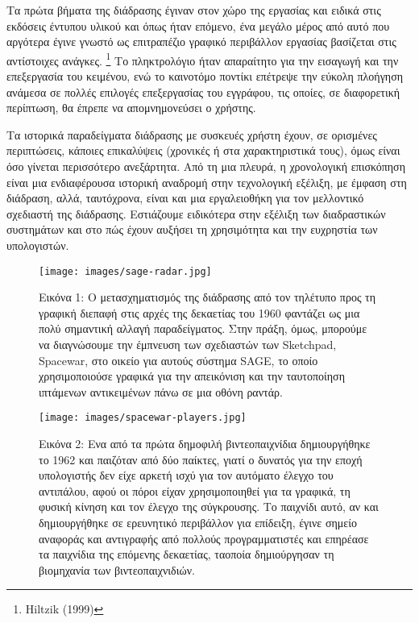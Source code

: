 \documentclass[
]{article}
\begin{document}
Τα πρώτα βήματα της διάδρασης έγιναν στον χώρο της εργασίας και ειδικά
στις εκδόσεις έντυπου υλικού και όπως ήταν επόμενο, ένα μεγάλο μέρος από
αυτό που αργότερα έγινε γνωστό ως επιτραπέζιο γραφικό περιβάλλον
εργασίας βασίζεται στις αντίστοιχες ανάγκες. \footnote{Hiltzik (1999)}
Το πληκτρολόγιο ήταν απαραίτητο για την εισαγωγή και την επεξεργασία του
κειμένου, ενώ το καινοτόμο ποντίκι επέτρεψε την εύκολη πλοήγηση ανάμεσα
σε πολλές επιλογές επεξεργασίας του εγγράφου, τις οποίες, σε διαφορετική
περίπτωση, θα έπρεπε να απομνημονεύσει ο χρήστης.

Τα ιστορικά παραδείγματα διάδρασης με συσκευές χρήστη έχουν, σε
ορισμένες περιπτώσεις, κάποιες επικαλύψεις (χρονικές ή στα
χαρακτηριστικά τους), όμως είναι όσο γίνεται περισσότερο ανεξάρτητα. Από
τη μια πλευρά, η χρονολογική επισκόπηση είναι μια ενδιαφέρουσα ιστορική
αναδρομή στην τεχνολογική εξέλιξη, με έμφαση στη διάδραση, αλλά,
ταυτόχρονα, είναι και μια εργαλειοθήκη για τον μελλοντικό σχεδιαστή της
διάδρασης. Εστιάζουμε ειδικότερα στην εξέλιξη των διαδραστικών
συστημάτων και στο πώς έχουν αυξήσει τη χρησιμότητα και την ευχρηστία
των υπολογιστών.

\leavevmode{}%
\begin{figure}
\hypertarget{fig:sage-radar}{%
\centering
\texttt{[image: images/sage-radar.jpg]}
\caption{Εικόνα 1: Ο μετασχηματισμός της διάδρασης από τον τηλέτυπο προς
τη γραφική διεπαφή στις αρχές της δεκαετίας του 1960 φαντάζει ως μια
πολύ σημαντική αλλαγή παραδείγματος. Στην πράξη, όμως, μπορούμε να
διαγνώσουμε την έμπνευση των σχεδιαστών των Sketchpad, Spacewar, στο
οικείο για αυτούς σύστημα SAGE, το οποίο χρησιμοποιούσε γραφικά για την
απεικόνιση και την ταυτοποίηση ιπτάμενων αντικειμένων πάνω σε μια οθόνη
ραντάρ.}\label{fig:sage-radar}
}
\end{figure}

\leavevmode{}%
\begin{figure}
\hypertarget{fig:spacewar-players}{%
\centering
\texttt{[image: images/spacewar-players.jpg]}
\caption{Εικόνα 2: Ενα από τα πρώτα δημοφιλή βιντεοπαιχνίδια
δημιουργήθηκε το 1962 και παιζόταν από δύο παίκτες, γιατί ο δυνατός για
την εποχή υπολογιστής δεν είχε αρκετή ισχύ για τον αυτόματο έλεγχο του
αντιπάλου, αφού οι πόροι είχαν χρησιμοποιηθεί για τα γραφικά, τη φυσική
κίνηση και τον έλεγχο της σύγκρουσης. Το παιχνίδι αυτό, αν και
δημιουργήθηκε σε ερευνητικό περιβάλλον για επίδειξη, έγινε σημείο
αναφοράς και αντιγραφής από πολλούς προγραμματιστές και επηρέασε τα
παιχνίδια της επόμενης δεκαετίας, ταοποία δημιούργησαν τη βιομηχανία των
βιντεοπαιχνιδιών.}\label{fig:spacewar-players}
}
\end{figure}
\end{document}
